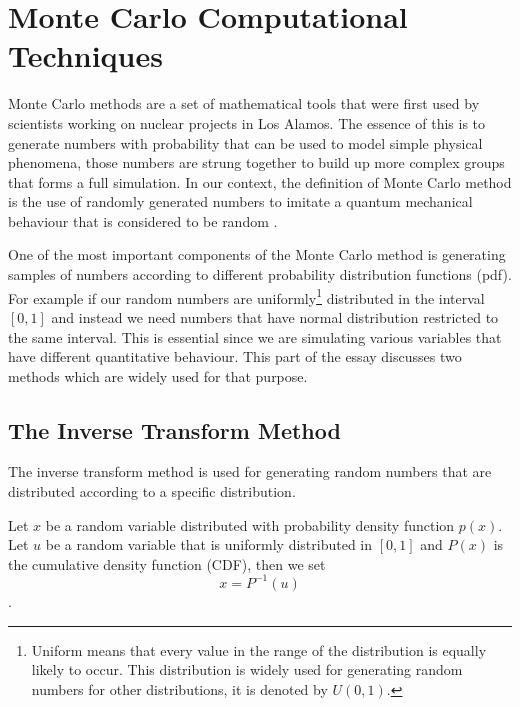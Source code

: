 \chapter{Monte Carlo Computational Techniques}

Monte Carlo methods are a set of mathematical tools that were first used by scientists working on nuclear projects in Los Alamos. The essence of this is to generate numbers with probability that can be used to model simple physical phenomena, those numbers are strung together to build up more complex groups that forms a full simulation. In our context, the definition of Monte Carlo method is the use of randomly generated numbers to imitate a quantum mechanical behaviour that is considered to be random \citep{montecarlo}.


One of the most important components of the Monte Carlo method is generating samples of numbers according to different probability distribution functions (pdf). For example if our random numbers are uniformly\footnote{Uniform means that every value in the range of the distribution is equally likely to occur. This distribution is widely used for generating random numbers for other distributions, it is denoted by $U (0,1)$.} distributed in the interval $[0,1]$  and instead we need numbers that have normal distribution restricted to the same interval. This is essential since we are simulating various variables that have different quantitative behaviour. This part of the essay  discusses two methods which are widely used for that purpose.


\section{The Inverse Transform Method}

The inverse transform method is used for generating random numbers that are distributed according to a specific distribution.

Let $x$ be a random variable distributed with probability density function $p(x)$. Let $u$ be a random variable that is uniformly distributed in $[0,1]$ and $P(x)$ is the cumulative density function (CDF), then we set 
\begin{equation}
x = P^{-1} (u)
\end{equation}\citep{Weinzierl}.

